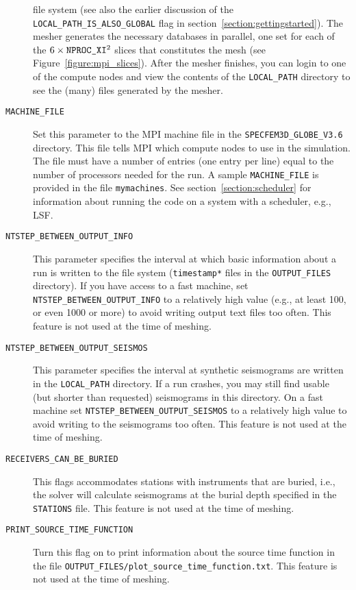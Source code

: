 \documentclass[onecolumn]{article}
\newcommand{\nprocxi}{\mbox{\texttt{NPROC\_XI}}}
\begin{document}
\begin{description}
file system
(see also the earlier discussion of the
\texttt{LOCAL\_PATH\_IS\_ALSO\_GLOBAL} flag in section~\ref{section:gettingstarted}).
The mesher generates the necessary databases in parallel,
one set for each of the $6\times\nprocxi^2$ slices that constitutes
the mesh (see Figure~\ref{figure:mpi_slices}).
After the mesher finishes, you can login to one of the compute nodes and
view the contents of the \texttt{LOCAL\_PATH} directory to see the (many) files
generated by the mesher.
\item[\texttt{MACHINE\_FILE}] Set this parameter to the MPI machine
file in the \texttt{SPECFEM3D\_GLOBE\_V3.6} directory.
This file tells MPI which compute nodes to use in the simulation.
The file must have a number of entries (one entry per line) equal
to the number of processors needed for the run.
A sample \texttt{MACHINE\_FILE} is provided in the file
\texttt{mymachines}.
See section~\ref{section:scheduler} for information about running
the code on a system with a scheduler, e.g., LSF.
\item[\texttt{NTSTEP\_BETWEEN\_OUTPUT\_INFO}] This parameter specifies
the interval at which basic information about a run is written to the file system
(\texttt{timestamp*} files in the \texttt{OUTPUT\_FILES} directory).
If you have access to a fast machine, set \texttt{NTSTEP\_BETWEEN\_OUTPUT\_INFO}
to a relatively high value (e.g., at least 100, or even 1000 or more)
to avoid writing output text files too often.
This feature is not used at the time of meshing.
\item[\texttt{NTSTEP\_BETWEEN\_OUTPUT\_SEISMOS}] This parameter specifies
the interval at synthetic seismograms are written in the
\texttt{LOCAL\_PATH} directory. If a run crashes, you may still
find usable (but shorter than requested)
seismograms in this directory.
On a fast machine set \texttt{NTSTEP\_BETWEEN\_OUTPUT\_SEISMOS}
to a relatively high value to avoid writing to the seismograms too often.
This feature is not used at the time of meshing.
\item[\texttt{RECEIVERS\_CAN\_BE\_BURIED}] This flags accommodates
stations with instruments that are buried, i.e., the solver will calculate
seismograms at the burial depth specified in the \texttt{STATIONS} file.
This feature is not used at the time of meshing.
\item[\texttt{PRINT\_SOURCE\_TIME\_FUNCTION}] Turn this flag on
to print information about the source time function in
the file \texttt{OUTPUT\_FILES/plot\_source\_time\_function.txt}.
This feature is not used at the time of meshing.
\end{description}
\end{document}
